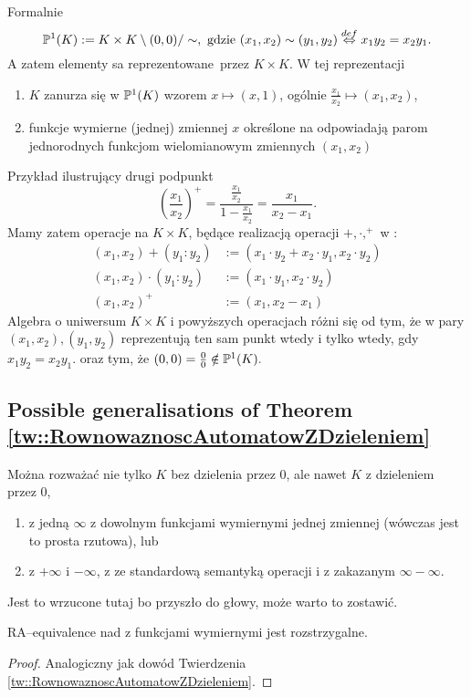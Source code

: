 \begin{df}
Formalnie 
$$
\mathbb{P}^{1}(K) := K \times K \setminus (0,0) / \sim, \text{ gdzie } (x_1, x_2) \sim (y_1, y_2) \stackrel{def}{\Leftrightarrow} x_1y_2 = x_2y_1.
$$
A zatem elementy  sa reprezentowane przez $K \times K$. W tej reprezentacji 
\begin{enumerate}
	\item $K$ zanurza się w $\mathbb{P}^{1}(K)$ wzorem $x \mapsto (x, 1)$, ogólnie $\frac{x_1}{x_2} \mapsto (x_1, x_2)$,
	\item funkcje wymierne (jednej) zmiennej $x$ określone na  odpowiadają parom jednorodnych funkcjom wielomianowym zmiennych $(x_1, x_2)$
\end{enumerate}
Przykład ilustrujący drugi podpunkt
\[
	\left( \frac{x_1}{x_2} \right)^+=\frac{\frac{x_1}{x_2}}{1-\frac{x_1}{x_2}} = \frac{x_1}{ x_2 - x_1}.
\]
Mamy zatem operacje na $K \times K$, będące realizacją operacji $+, \cdot, ^+$ w : 
\begin{subequations}
	\renewcommand{\theequation}{\theparentequation.\arabic{equation}}
	\begin{align}\label{eq::ProjJakoKtimesK1}
	(x_1, x_2) + (y_1:y_2) &:= (x_1 \cdot y_2 + x_2 \cdot y_1, x_2 \cdot y_2)\\
	(x_1, x_2) \cdot (y_1:y_2) &:= (x_1 \cdot y_1, x_2 \cdot y_2) \\
	(x_1, x_2)^+      &:= (x_1, x_2 -x_1) \label{eq::ProjJakoKtimesK3}
	\end{align}
\end{subequations}
Algebra o uniwersum $K \times K$ i powyższych operacjach różni się od  tym, że w  pary $(x_1, x_2), (y_1, y_2)$ reprezentują ten sam punkt wtedy i tylko wtedy, gdy $ x_1y_2 = x_2y_1.$ oraz tym, że $(0, 0) = \frac{0}{0} \notin \mathbb{P}^{1}(K).$
\subsection{Possible generalisations of Theorem \ref{tw::RownowaznoscAutomatowZDzieleniem}}
Można rozważać nie tylko $K$ bez dzielenia przez 0, ale nawet 
$K$ z dzieleniem przez 0, 
\begin{enumerate}
	\item 
z jedną $\infty$ z dowolnym funkcjami wymiernymi jednej zmiennej (wówczas jest to prosta rzutowa), lub
	\item  \Q z $+\infty$ i $-\infty$, z ze standardową semantyką operacji i z zakazanym $\infty - \infty$. 
\end{enumerate}
Jest to wrzucone tutaj bo przyszło do głowy, może warto to zostawić.
\begin{lm}
	RA--equivalence nad  z funkcjami wymiernymi jest rozstrzygalne.
\end{lm}
\begin{proof}
	Analogiczny jak dowód Twierdzenia \ref{tw::RownowaznoscAutomatowZDzieleniem}.
\end{proof}

\end{df}
